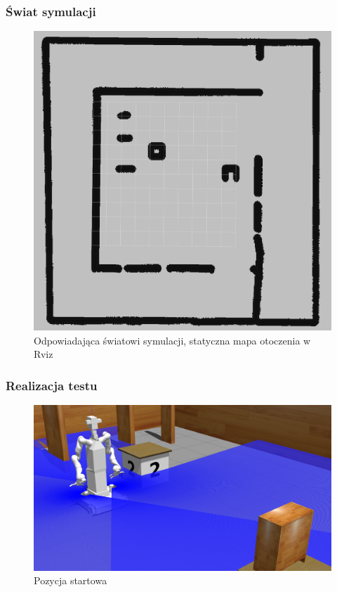 \addtocounter{framenumber}{-1}
\begin{frame}
	\frametitle{Świat symulacji}
	\begin{figure}[b]
        \label{sim_map}
        \centering
        \def\svgwidth{\columnwidth}
        \includegraphics[scale=0.22]{images/static_map.jpg}
        \caption{Odpowiadająca światowi symulacji, statyczna mapa otoczenia w Rviz}
    \end{figure}
\end{frame}

\begin{frame}
	\frametitle{Realizacja testu}
	\begin{figure}[b]
        \label{sim_map}
        \centering
        \def\svgwidth{\columnwidth}
        \includegraphics[scale=0.25]{images/testpuszka/start.png}
        \caption{Pozycja startowa}
    \end{figure}
\end{frame}

